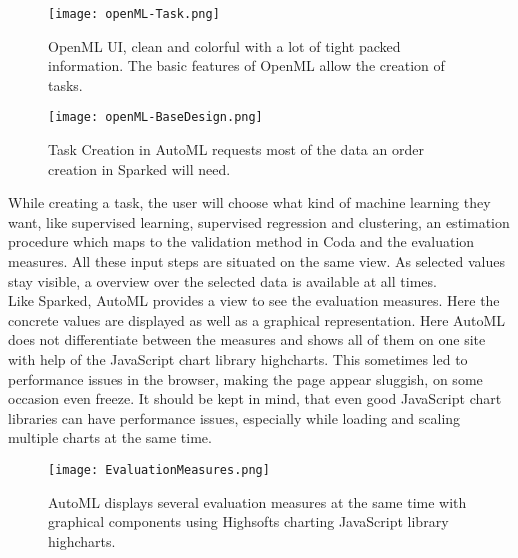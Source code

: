 \begin{figure}
	\texttt{[image: openML-Task.png]}
	\caption{OpenML UI, clean and colorful with a lot of tight packed information. The basic features of OpenML allow the creation of tasks. }
\end{figure}

\begin{figure}
	\texttt{[image: openML-BaseDesign.png]}
	\caption{Task Creation in AutoML requests most of the data an order creation in Sparked will need. }
\end{figure}

While creating a task, the user will choose what kind of machine learning they want, like supervised learning, supervised regression and clustering, an estimation procedure which maps to the validation method in Coda and the evaluation measures. All these input steps are situated on the same view. As selected values stay visible, a overview over the selected data is available at all times.\\

Like Sparked, AutoML provides a view to see the evaluation measures. Here the concrete values are displayed as well as a graphical representation. Here AutoML does not differentiate between the measures and shows all of them on one site with help of the JavaScript chart library highcharts. This sometimes led to performance issues in the browser, making the page appear sluggish, on some occasion even freeze. It should be kept in mind, that even good JavaScript chart libraries can have performance issues, especially while loading and scaling multiple charts at the same time.

\begin{figure}
	\texttt{[image: EvaluationMeasures.png]}
	\caption{AutoML displays several evaluation measures at the same time with graphical components using Highsofts charting JavaScript library highcharts. }
\end{figure}
